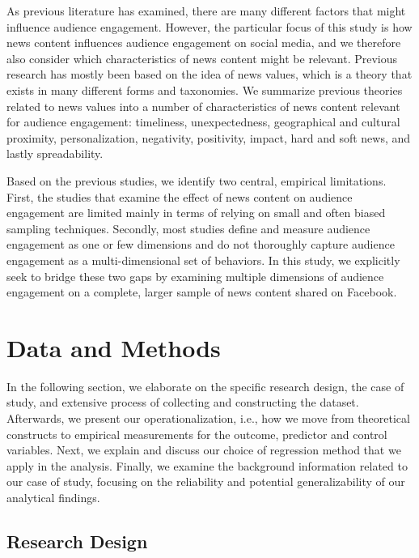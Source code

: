 \documentclass[
]{article}
\begin{document}
As previous literature has examined, there are many different factors
that might influence audience engagement. However, the particular focus
of this study is how news content influences audience engagement on
social media, and we therefore also consider which characteristics of
news content might be relevant. Previous research has mostly been based
on the idea of news values, which is a theory that exists in many
different forms and taxonomies. We summarize previous theories related
to news values into a number of characteristics of news content relevant
for audience engagement: timeliness, unexpectedness, geographical and
cultural proximity, personalization, negativity, positivity, impact,
hard and soft news, and lastly spreadability.

Based on the previous studies, we identify two central, empirical
limitations. First, the studies that examine the effect of news content
on audience engagement are limited mainly in terms of relying on small
and often biased sampling techniques. Secondly, most studies define and
measure audience engagement as one or few dimensions and do not
thoroughly capture audience engagement as a multi-dimensional set of
behaviors. In this study, we explicitly seek to bridge these two gaps by
examining multiple dimensions of audience engagement on a complete,
larger sample of news content shared on Facebook.

\pagebreak

\hypertarget{data-and-methods-1}{%
\section{Data and Methods}\label{data-and-methods-1}}

In the following section, we elaborate on the specific research design,
the case of study, and extensive process of collecting and constructing
the dataset. Afterwards, we present our operationalization, i.e., how we
move from theoretical constructs to empirical measurements for the
outcome, predictor and control variables. Next, we explain and discuss
our choice of regression method that we apply in the analysis. Finally,
we examine the background information related to our case of study,
focusing on the reliability and potential generalizability of our
analytical findings.

\hypertarget{research-design}{%
\subsection{Research Design}\label{research-design}}
\end{document}
